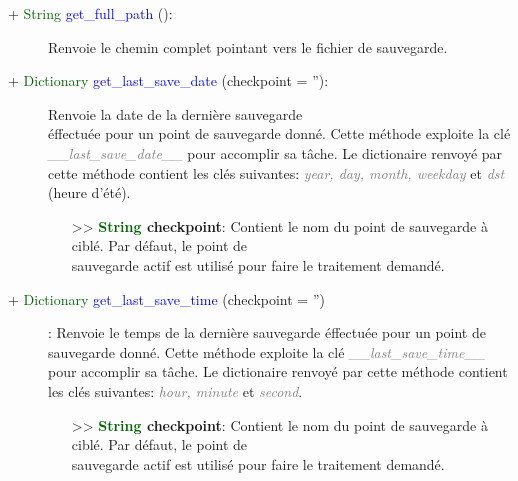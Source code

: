 \documentclass[a4paper, 11pt]{article}
\begin{document}
	\begin{description}
		\item [+ \textcolor{darkgreen}{String} \textcolor{blue}{get\_full\_path} ():] Renvoie le chemin
		complet pointant vers le fichier de sauvegarde.\\
	\end{description}
	\begin{description}
		\item [+ \textcolor{darkgreen}{Dictionary} \textcolor{blue}{get\_last\_save\_date} (checkpoint =
		''):] Renvoie la date de la dernière sauvegarde \\éffectuée pour un point de sauvegarde donné. Cette
		méthode exploite la clé \textit{\textcolor {gray}{\_\_last\_save\_date\_\_}} pour accomplir sa
		tâche. Le dictionaire renvoyé par cette méthode contient les clés suivantes:
		\textit{\textcolor{gray}{year, day, month, weekday}} et \textit{\textcolor{gray}{dst}} (heure
		d'été).
		\begin{itemize}
			\item [>> \textbf{\textcolor{darkgreen}{String} checkpoint}:] Contient le nom du point de 
			sauvegarde à ciblé. Par défaut, le point de \\sauvegarde actif est utilisé pour faire le
			traitement demandé.\\
		\end{itemize}
	\end{description}
	\begin{description}
		\item [+ \textcolor{darkgreen}{Dictionary} \textcolor{blue}{get\_last\_save\_time} (checkpoint =
		'')]: Renvoie le temps de la dernière sauvegarde éffectuée pour un point de sauvegarde donné. Cette
		méthode exploite la clé \textit{\textcolor {gray}{\_\_last\_save\_time\_\_}} pour accomplir sa
		tâche. Le dictionaire renvoyé par cette méthode contient les clés suivantes:
		\textit{\textcolor{gray}{hour, minute}} et \textit{\textcolor{gray}{second}}.
		\begin{itemize}
			\item [>> \textbf{\textcolor{darkgreen}{String} checkpoint}:] Contient le nom du point de 
			sauvegarde à ciblé. Par défaut, le point de \\sauvegarde actif est utilisé pour faire le
			traitement demandé.\\
		\end{itemize}
	\end{description}
\end{document}
